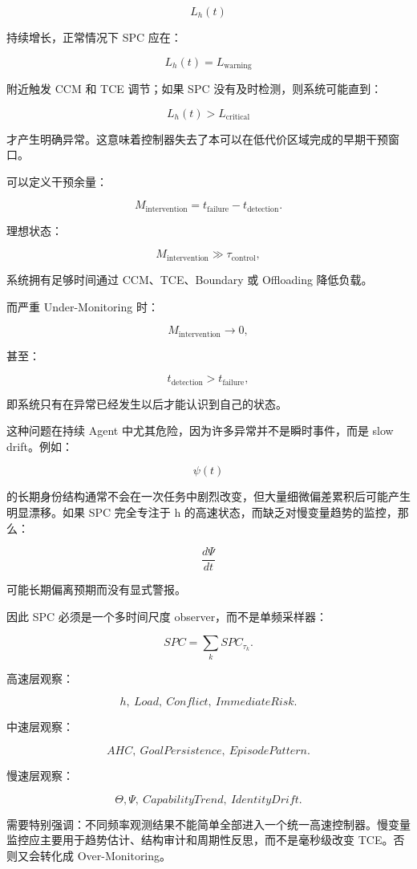 \[
L_h(t)
\]

持续增长，正常情况下 SPC 应在：

\[
L_h(t)=L_{\mathrm{warning}}
\]

附近触发 CCM 和 TCE 调节；如果 SPC 没有及时检测，则系统可能直到：

\[
L_h(t)>L_{\mathrm{critical}}
\]

才产生明确异常。这意味着控制器失去了本可以在低代价区域完成的早期干预窗口。

可以定义干预余量：

\[
M_{\mathrm{intervention}}
=
t_{\mathrm{failure}}
-
t_{\mathrm{detection}}.
\]

理想状态：

\[
M_{\mathrm{intervention}}\gg \tau_{\mathrm{control}},
\]

系统拥有足够时间通过 CCM、TCE、Boundary 或 Offloading 降低负载。

而严重 Under-Monitoring 时：

\[
M_{\mathrm{intervention}}
\rightarrow0,
\]

甚至：

\[
t_{\mathrm{detection}}
>
t_{\mathrm{failure}},
\]

即系统只有在异常已经发生以后才能认识到自己的状态。

这种问题在持续 Agent 中尤其危险，因为许多异常并不是瞬时事件，而是 slow drift。例如：

\[
\psi(t)
\]

的长期身份结构通常不会在一次任务中剧烈改变，但大量细微偏差累积后可能产生明显漂移。如果 SPC 完全专注于 h 的高速状态，而缺乏对慢变量趋势的监控，那么：

\[
\frac{d\Psi}{dt}
\]

可能长期偏离预期而没有显式警报。

因此 SPC 必须是一个多时间尺度 observer，而不是单频采样器：

\[
\boxed{
SPC
=
\sum_k
SPC_{\tau_k}.
}
\]

高速层观察：

\[
h,\ Load,\ Conflict,\ ImmediateRisk.
\]

中速层观察：

\[
AHC,\ GoalPersistence,\ EpisodePattern.
\]

慢速层观察：

\[
\Theta,\Psi,\ CapabilityTrend,\ IdentityDrift.
\]

需要特别强调：不同频率观测结果不能简单全部进入一个统一高速控制器。慢变量监控应主要用于趋势估计、结构审计和周期性反思，而不是毫秒级改变 TCE。否则又会转化成 Over-Monitoring。

